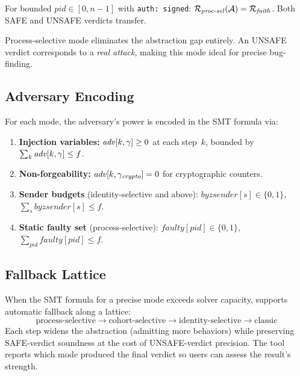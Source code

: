 \begin{theorem}\label{thm:procsel}
For bounded $\mathit{pid} \in [0, n{-}1]$ with \texttt{auth: signed}:
$\mathcal{R}_{\mathit{proc\text{-}sel}}(\mathcal{A}) =
 \mathcal{R}_{\mathit{faith}}$.
Both SAFE and UNSAFE verdicts transfer.
\end{theorem}

Process-selective mode eliminates the abstraction gap entirely.  An
UNSAFE verdict corresponds to a \emph{real attack}, making this mode
ideal for precise bug-finding.

\subsection{Adversary Encoding}

For each mode, the adversary's power is encoded in the SMT formula via:
\begin{enumerate}
  \item \textbf{Injection variables:}
    $\mathit{adv}[k, \gamma] \geq 0$ at each step~$k$, bounded by
    $\sum_k \mathit{adv}[k, \gamma] \leq f$.
  \item \textbf{Non-forgeability:}
    $\mathit{adv}[k, \gamma_{\mathit{crypto}}] = 0$ for cryptographic counters.
  \item \textbf{Sender budgets} (identity-selective and above):
    $\mathit{byzsender}[s] \in \{0,1\}$,
    $\sum_s \mathit{byzsender}[s] \leq f$.
  \item \textbf{Static faulty set} (process-selective):
    $\mathit{faulty}[\mathit{pid}] \in \{0,1\}$,
    $\sum_{\mathit{pid}} \mathit{faulty}[\mathit{pid}] \leq f$.
\end{enumerate}

\subsection{Fallback Lattice}

When the SMT formula for a precise mode exceeds solver capacity,
\tarsier{} supports automatic fallback along a lattice:
\[
  \text{process-selective}
  \rightarrow \text{cohort-selective}
  \rightarrow \text{identity-selective}
  \rightarrow \text{classic}
\]
Each step widens the abstraction (admitting more behaviors) while
preserving SAFE-verdict soundness at the cost of UNSAFE-verdict
precision.  The tool reports which mode produced the final verdict so
users can assess the result's strength.
